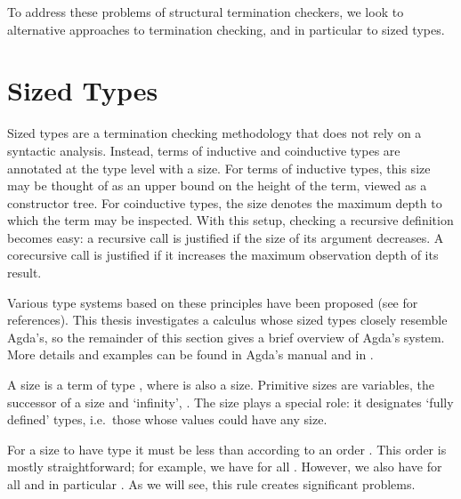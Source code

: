 To address these problems of structural termination checkers, we look to
alternative approaches to termination checking, and in particular to sized
types.


\section{Sized Types}
\label{sec:background:sized}

Sized types are a termination checking methodology that does not rely on a
syntactic analysis. Instead, terms of inductive and coinductive types are
annotated at the type level with a size. For terms of inductive types, this size
may be thought of as an upper bound on the height of the term, viewed as a
constructor tree. For coinductive types, the size denotes the maximum depth to
which the term may be inspected. With this setup, checking a recursive
definition becomes easy: a recursive call is justified if the size of its
argument decreases. A corecursive call is justified if it increases the maximum
observation depth of its result.

Various type systems based on these principles have been proposed (see
 for references). This thesis investigates a calculus
whose sized types closely resemble Agda's, so the remainder of this section
gives a brief overview of Agda's system. More details and examples can be found
in Agda's manual \cite{agdamanual} and in \cite{abel2016}.

A size is a term of type , where  is also a size.
Primitive sizes are variables, the successor of a size  and
\enquote*{infinity}, . The size  plays a special role: it
designates \enquote*{fully defined} types, i.e.\ those whose values could have any
size.

For a size  to have type  it must be less than
 according to an order \icode{<}. This order is mostly straightforward;
for example, we have  for all . However, we also have
 for all  and in particular . As we will see,
this rule creates significant problems.

